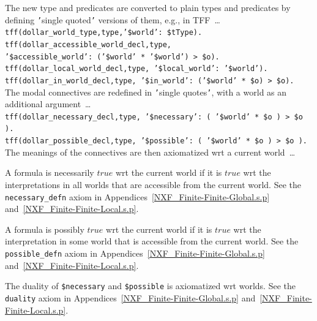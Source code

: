 \documentclass{easychair}
\newcommand{\smalltt}[1]{\small \texttt{#1}}
\newenvironment{packed_itemize}{
\vspace*{-0.3em}
\begin{itemize}
\setlength{\partopsep}{0pt}
\setlength{\itemsep}{1pt}
\setlength{\parskip}{0pt}
\setlength{\parsep}{0pt}
}{\end{itemize}}
\begin{document}
The new type and predicates are converted to plain types and predicates by defining {\tt '}single 
quoted{\tt '} versions of them, e.g., in TFF~\ldots \\
\hspace*{0.5cm}\smalltt{tff(dollar\_world\_type,type,'\$world': \$tType).} \\
\hspace*{0.5cm}\smalltt{tff(dollar\_accessible\_world\_decl,type,} \\
\hspace*{0.8cm}\smalltt{'\$accessible\_world': ('\$world' * '\$world') > \$o).} \\
\hspace*{0.5cm}\smalltt{tff(dollar\_local\_world\_decl,type, '\$local\_world': '\$world').} \\
\hspace*{0.5cm}\smalltt{tff(dollar\_in\_world\_decl,type, '\$in\_world': ('\$world' * \$o) > \$o).} \\
The modal connectives are redefined in {\tt '}single quotes{\tt '}, with a world as an additional
argument~\ldots \\
\hspace*{0.5cm}\smalltt{tff(dollar\_necessary\_decl,type, '\$necessary': ( '\$world' * \$o ) > \$o ).} \\
\hspace*{0.5cm}\smalltt{tff(dollar\_possible\_decl,type, '\$possible': ( '\$world' * \$o ) > \$o ).} \\
The meanings of the connectives are then axiomatized wrt a current world~\ldots
\begin{packed_itemize}
\item A formula is necessarily $true$ wrt the current world if it is $true$ wrt the interpretations
      in all worlds that are accessible from the current world.
      See the {\tt necessary\_defn} axiom in Appendices~\ref{NXF_Finite-Finite-Global.s.p}
      and~\ref{NXF_Finite-Finite-Local.s.p}.
\item A formula is possibly $true$ wrt the current world if it is $true$ wrt the interpretation
      in some world that is accessible from the current world.
      See the {\tt possible\_defn} axiom in Appendices~\ref{NXF_Finite-Finite-Global.s.p}
      and~\ref{NXF_Finite-Finite-Local.s.p}.
\item The duality of {\tt \$necessary} and {\tt \$possible} is axiomatized wrt worlds.
      See the {\tt duality} axiom in Appendices~\ref{NXF_Finite-Finite-Global.s.p}
      and~\ref{NXF_Finite-Finite-Local.s.p}.
\end{packed_itemize}
\end{document}
